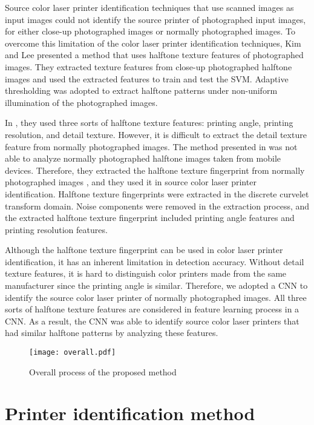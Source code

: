\documentclass[5p, times]{elsarticle}
\begin{document}
Source color laser printer identification techniques that use scanned images as input images could not identify the source printer of photographed input images, for either close-up photographed images or normally photographed images. To overcome this limitation of the color laser printer identification techniques, Kim and Lee \cite{Kim1} presented a method that uses halftone texture features of photographed images. They extracted texture features from close-up photographed halftone images and used the extracted features to train and test the SVM. Adaptive thresholding was adopted to extract halftone patterns under non-uniform illumination of the photographed images.

In \cite{Kim1}, they used three sorts of halftone texture features: printing angle, printing resolution, and detail texture. However, it is difficult to extract the detail texture feature from normally photographed images. The method presented in \cite{Kim1} was not able to analyze normally photographed halftone images taken from mobile devices. Therefore, they extracted the halftone texture fingerprint from normally photographed images \cite{Kim2}, and they used it in source color laser printer identification. Halftone texture fingerprints were extracted in the discrete curvelet transform domain. Noise components were removed in the extraction process, and the extracted halftone texture fingerprint included printing angle features and printing resolution features.

Although the halftone texture fingerprint can be used in color laser printer identification, it has an inherent limitation in detection accuracy. Without detail texture features, it is hard to distinguish color printers made from the same manufacturer since the printing angle is similar. Therefore, we adopted a CNN to identify the source color laser printer of normally photographed images. All three sorts of halftone texture features are considered in feature learning process in a CNN. As a result, the CNN was able to identify source color laser printers that had similar halftone patterns by analyzing these features.

\begin{figure}[t!]
    \centerline{\texttt{[image: overall.pdf]}}
    \caption{Overall process of the proposed method
    } \label{Overall}
\end{figure}

\section{Printer identification method}
\end{document}
